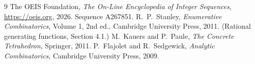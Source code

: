 \documentclass[11pt,a4paper]{article}
\theoremstyle{plain}
\theoremstyle{definition}
\begin{document}
\begin{thebibliography}{9}
 The OEIS Foundation, \emph{The On-Line Encyclopedia of Integer
Sequences}, \url{https://oeis.org}, 2026. Sequence A267851.
 R.~P.~Stanley, \emph{Enumerative Combinatorics}, Volume 1, 2nd ed.,
Cambridge University Press, 2011. (Rational generating functions, Section 4.1.)
 M.~Kauers and P.~Paule, \emph{The Concrete Tetrahedron}, Springer, 2011.
 P.~Flajolet and R.~Sedgewick, \emph{Analytic Combinatorics}, Cambridge
University Press, 2009.
\end{thebibliography}
\end{document}
